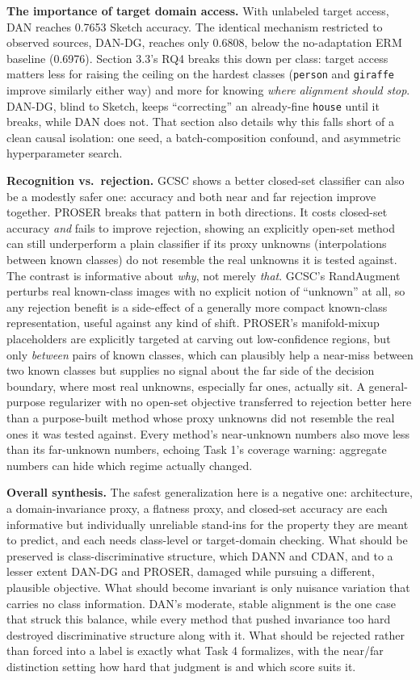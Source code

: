 \documentclass{article}
\begin{document}
\textbf{The importance of target domain access.} With unlabeled target access, DAN reaches 0.7653
Sketch accuracy. The identical mechanism restricted to observed sources, DAN-DG, reaches only
0.6808, below the no-adaptation ERM baseline (0.6976). Section 3.3's RQ4 breaks this down per
class: target access matters less for raising the ceiling on the hardest classes (\texttt{person}
and \texttt{giraffe} improve similarly either way) and more for knowing \emph{where alignment
should stop}. DAN-DG, blind to Sketch, keeps ``correcting'' an already-fine \texttt{house} until it
breaks, while DAN does not. That section also details why this falls short of a clean causal
isolation: one seed, a batch-composition confound, and asymmetric hyperparameter search.

\textbf{Recognition vs.\ rejection.} GCSC shows a better closed-set classifier can also be a
modestly safer one: accuracy and both near and far rejection improve together. PROSER breaks that
pattern in both directions. It costs closed-set accuracy \emph{and} fails to improve rejection,
showing an explicitly open-set method can still underperform a plain classifier if its proxy
unknowns (interpolations between known classes) do not resemble the real unknowns it is tested
against. The contrast is informative about \emph{why}, not merely \emph{that}. GCSC's RandAugment
perturbs real known-class images with no explicit notion of ``unknown'' at all, so any rejection
benefit is a side-effect of a generally more compact known-class representation, useful against any
kind of shift. PROSER's manifold-mixup placeholders are explicitly targeted at carving out
low-confidence regions, but only \emph{between} pairs of known classes, which can plausibly help a
near-miss between two known classes but supplies no signal about the far side of the decision
boundary, where most real unknowns, especially far ones, actually sit. A general-purpose
regularizer with no open-set objective transferred to rejection better here than a purpose-built
method whose proxy unknowns did not resemble the real ones it was tested against. Every method's
near-unknown numbers also move less than its far-unknown numbers, echoing Task 1's coverage
warning: aggregate numbers can hide which regime actually changed.

\textbf{Overall synthesis.} The safest generalization here is a negative one: architecture, a
domain-invariance proxy, a flatness proxy, and closed-set accuracy are each informative but
individually unreliable stand-ins for the property they are meant to predict, and each needs
class-level or target-domain checking. What should be preserved is class-discriminative structure,
which DANN and CDAN, and to a lesser extent DAN-DG and PROSER, damaged while pursuing a different,
plausible objective. What should become invariant is only nuisance variation that carries no class
information. DAN's moderate, stable alignment is the one case that struck this balance, while every
method that pushed invariance too hard destroyed discriminative structure along with it. What
should be rejected rather than forced into a label is exactly what Task 4 formalizes, with the
near/far distinction setting how hard that judgment is and which score suits it.
\end{document}
